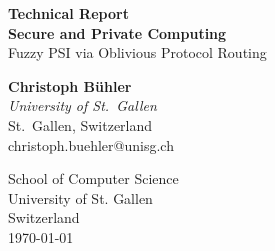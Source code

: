 \begin{titlepage}
	\begin{center}
		\vspace*{1cm}

		\Huge
		\textbf{Technical Report \\ Secure and Private Computing} \\
		Fuzzy PSI via Oblivious Protocol Routing

		\vspace{2em}
		\Large

		\textbf{Christoph Bühler} \\
		\textit{University of St.\ Gallen} \\
		St.\ Gallen, Switzerland \\
		christoph.buehler@unisg.ch

		\vfill

		\Large
		School of Computer Science\\
		University of St. Gallen\\
		Switzerland\\
		\today

	\end{center}
\end{titlepage}
